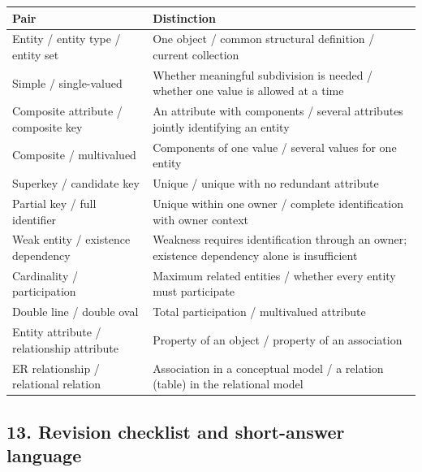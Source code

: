 \begin{longtable}[]{@{}
  >{\raggedright\arraybackslash}p{}
  >{\raggedright\arraybackslash}p{}@{}}
\toprule\noalign{}
\begin{minipage}[b]{\linewidth}\raggedright
Pair
\end{minipage} & \begin{minipage}[b]{\linewidth}\raggedright
Distinction
\end{minipage} \\
\midrule\noalign{}
\endhead
\bottomrule\noalign{}
\endlastfoot
Entity / entity type / entity set & One object / common structural definition / current collection \\
Simple / single-valued & Whether meaningful subdivision is needed / whether one value is allowed at a time \\
Composite attribute / composite key & An attribute with components / several attributes jointly identifying an entity \\
Composite / multivalued & Components of one value / several values for one entity \\
Superkey / candidate key & Unique / unique with no redundant attribute \\
Partial key / full identifier & Unique within one owner / complete identification with owner context \\
Weak entity / existence dependency & Weakness requires identification through an owner; existence dependency alone is insufficient \\
Cardinality / participation & Maximum related entities / whether every entity must participate \\
Double line / double oval & Total participation / multivalued attribute \\
Entity attribute / relationship attribute & Property of an object / property of an association \\
ER relationship / relational relation & Association in a conceptual model / a relation (table) in the relational model \\
\end{longtable}

\subsection{13. Revision checklist and short-answer language}\label{02_er_modelling_en-revision-checklist-and-short-answer-language}

